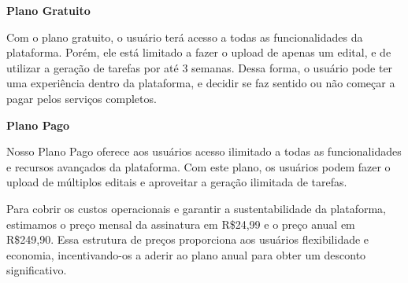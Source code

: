 \textbf{Plano Gratuito}

Com o plano gratuito, o usuário terá acesso a todas as funcionalidades da plataforma. Porém, ele está limitado a fazer o upload de apenas um edital, e de utilizar a geração de tarefas por até 3 semanas. Dessa forma, o usuário pode ter uma experiência dentro da plataforma, e decidir se faz sentido ou não começar a pagar pelos serviços completos.

\textbf{Plano Pago}

Nosso Plano Pago oferece aos usuários acesso ilimitado a todas as funcionalidades e recursos avançados da plataforma. Com este plano, os usuários podem fazer o upload de múltiplos editais e aproveitar a geração ilimitada de tarefas.

Para cobrir os custos operacionais e garantir a sustentabilidade da plataforma, estimamos o preço mensal da assinatura em R\$24,99 e o preço anual em R\$249,90. Essa estrutura de preços proporciona aos usuários flexibilidade e economia, incentivando-os a aderir ao plano anual para obter um desconto significativo.

